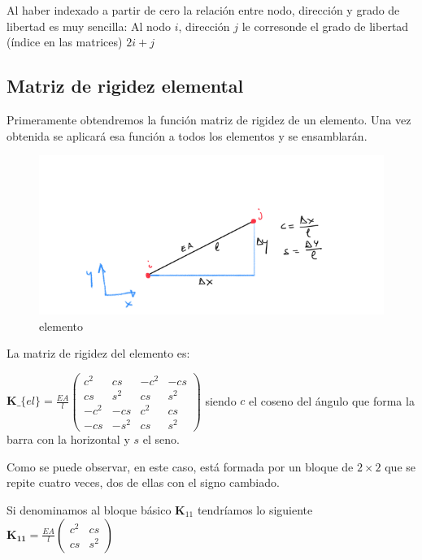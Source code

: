 \documentclass[11pt]{article}
\begin{document}
Al haber indexado a partir de cero la relación entre nodo, dirección y
grado de libertad es muy sencilla: Al nodo $i$, dirección $j$ le
corresonde el grado de libertad (índice en las matrices) $2i+j$

    \hypertarget{matriz-de-rigidez-elemental}{%
\subsection{Matriz de rigidez
elemental}\label{matriz-de-rigidez-elemental}}

Primeramente obtendremos la función matriz de rigidez de un elemento.
Una vez obtenida se aplicará esa función a todos los elementos y se
ensamblarán.

\begin{figure}
\centering
\includegraphics{elemento.png}
\caption{elemento}
\end{figure}

La matriz de rigidez del elemento es:

$ \mathbf{K}\_\{el\} = \frac{EA}{l}
\begin{pmatrix}
c^2 & cs & -c^2 & -cs \\
cs  & s^2 & cs & s^2 \\
-c^2 & -cs & c^2 & cs \\
-cs &  -s^2 & cs & s^2
\end{pmatrix}
$ 
siendo $c$ el coseno del ángulo que forma la barra con la
horizontal y $s$ el seno.

Como se puede observar, en este caso, está formada por un bloque de
$2\times2$ que se repite cuatro veces, dos de ellas con el signo
cambiado.

Si denominamos al bloque básico $\mathbf{K}_{11}$ tendríamos lo
siguiente $ \mathbf{K_{11}} = \frac{EA}{l}
\begin{pmatrix}
c^2 & cs \\
cs & s^2 
\end{pmatrix}
$
\end{document}
